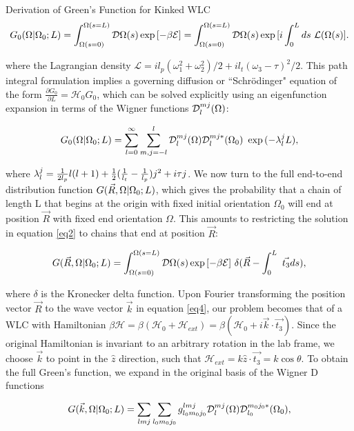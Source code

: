 \documentclass[11pt]{article}
\begin{document}
\begin{flushleft}
\begin{section}{Derivation of Green's Function for Kinked WLC}
\begin{equation}\label{eq2}
\greens = \int_{\Omega(s=0)}^{\Omega(s=L)}\mathcal{D}\Omega(s)\exp{ [-\beta \mathcal{E}]} = \int_{\Omega(s=0)}^{\Omega(s=L)}\mathcal{D}\Omega(s)\exp{ [i\int_0^Lds~\mathcal{L}(\Omega(s)]}.
\end{equation}

where the Lagrangian density $\mathcal{L} = il_p(\omega_1^2 + \omega_2^2)/2+il_t(\omega_3- \tau)^2/2$. This path integral formulation implies a governing diffusion or ``Schrödinger" equation of the form ${\frac{\partial G_0}{\partial L} =\mathcal{H}_0 G_0}$,
which can be solved explicitly using an eigenfunction expansion in terms of the Wigner functions $\wigD{l}{m}{j}(\Omega)$:

\begin{equation}\label{eq3}
\greens = \wigDexpand{}~\exp{(-\lambda_l^jL)},
\end{equation}

where ${\lambda_l^j = \lamlj}$. We now turn to the full end-to-end distribution function $\greensR$, which gives the probability that a chain of length L that begins at the origin with fixed initial orientation $\Omega_0$ will end at position $\vec{R}$ with fixed end orientation $\Omega$. This amounts to restricting the solution in equation \ref{eq2} to chains that end at position $\vec{R}$:

\begin{equation}\label{eq4}
\greensR = \int_{\Omega(s=0)}^{\Omega(s=L)}\mathcal{D}\Omega(s)\exp{ [-\beta \mathcal{E}]}~\delta(\vec{R}-\int_0^L~\vec{t_3}ds),
\end{equation}

where $\delta$ is the Kronecker delta function. Upon Fourier transforming the position vector $\vec{R}$ to the wave vector $\vec{k}$ in equation \ref{eq4}, our problem becomes that of a WLC with Hamiltonian
${\beta\mathcal{H} = \beta(\mathcal{H}_0 + \mathcal{H}_{ext}) = \beta(\mathcal{H}_0 + i\vec{k}\cdot\vec{t_3})}$. Since the original Hamiltonian is invariant to an arbitrary rotation in the lab frame, we choose $\vec{k}$ to point in the $\hat{z}$ direction, such that $\mathcal{H}_{ext}=k\hat{z}\cdot\vec{t_3}=k\cos\theta$. To obtain the full Green's function, we expand in the original basis of the Wigner D functions

\begin{equation}\label{eq5}
\greensk = \wigDexpandshort{g_{l_0m_0j_0}^{lmj}},
\end{equation}


\end{section}
\end{flushleft}
\end{document}
